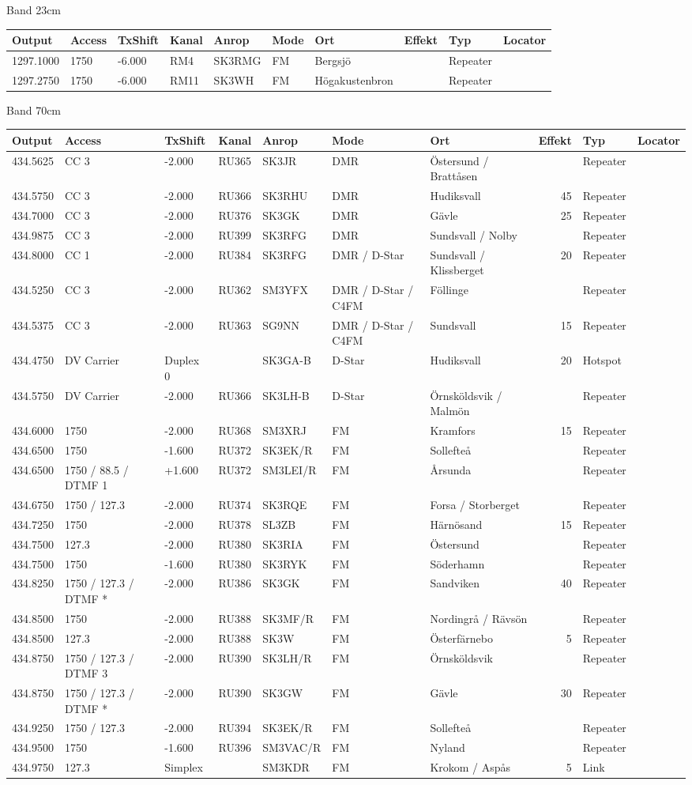 \large{Band 23cm}
\begin{longtable}{lllllllrlr}
Output & Access & TxShift & Kanal & Anrop & Mode & Ort & Effekt & Typ & Locator \\ \hline
1297.1000&1750&-6.000&RM4&SK3RMG&FM&Bergsjö&&Repeater&\\
1297.2750&1750&-6.000&RM11&SK3WH&FM&Högakustenbron&&Repeater&\\
\end{longtable}
\large{Band 70cm}
\begin{longtable}{lllllllrlr}
Output & Access & TxShift & Kanal & Anrop & Mode & Ort & Effekt & Typ & Locator \\ \hline
434.5625&CC 3&-2.000&RU365&SK3JR&DMR&Östersund / Brattåsen&&Repeater&\\
434.5750&CC 3&-2.000&RU366&SK3RHU&DMR&Hudiksvall&45&Repeater&\\
434.7000&CC 3&-2.000&RU376&SK3GK&DMR&Gävle&25&Repeater&\\
434.9875&CC 3&-2.000&RU399&SK3RFG&DMR&Sundsvall / Nolby&&Repeater&\\
434.8000&CC 1&-2.000&RU384&SK3RFG&DMR / D-Star&Sundsvall / Klissberget&20&Repeater&\\
434.5250&CC 3&-2.000&RU362&SM3YFX&DMR / D-Star / C4FM&Föllinge&&Repeater&\\
434.5375&CC 3&-2.000&RU363&SG9NN&DMR / D-Star / C4FM&Sundsvall&15&Repeater&\\
434.4750&DV Carrier&Duplex 0&&SK3GA-B&D-Star&Hudiksvall&20&Hotspot&\\
434.5750&DV Carrier&-2.000&RU366&SK3LH-B&D-Star&Örnsköldsvik / Malmön&&Repeater&\\
434.6000&1750&-2.000&RU368&SM3XRJ&FM&Kramfors&15&Repeater&\\
434.6500&1750&-1.600&RU372&SK3EK/R&FM&Sollefteå&&Repeater&\\
434.6500&1750 / 88.5 / DTMF 1&+1.600&RU372&SM3LEI/R&FM&Årsunda&&Repeater&\\
434.6750&1750 / 127.3&-2.000&RU374&SK3RQE&FM&Forsa / Storberget&&Repeater&\\
434.7250&1750&-2.000&RU378&SL3ZB&FM&Härnösand&15&Repeater&\\
434.7500&127.3&-2.000&RU380&SK3RIA&FM&Östersund&&Repeater&\\
434.7500&1750&-1.600&RU380&SK3RYK&FM&Söderhamn&&Repeater&\\
434.8250&1750 / 127.3 / DTMF *&-2.000&RU386&SK3GK&FM&Sandviken&40&Repeater&\\
434.8500&1750&-2.000&RU388&SK3MF/R&FM&Nordingrå / Rävsön&&Repeater&\\
434.8500&127.3&-2.000&RU388&SK3W&FM&Österfärnebo&5&Repeater&\\
434.8750&1750 / 127.3 / DTMF 3&-2.000&RU390&SK3LH/R&FM&Örnsköldsvik&&Repeater&\\
434.8750&1750 / 127.3 / DTMF *&-2.000&RU390&SK3GW&FM&Gävle&30&Repeater&\\
434.9250&1750 / 127.3&-2.000&RU394&SK3EK/R&FM&Sollefteå&&Repeater&\\
434.9500&1750&-1.600&RU396&SM3VAC/R&FM&Nyland&&Repeater&\\
434.9750&127.3&Simplex&&SM3KDR&FM&Krokom / Aspås&5&Link&\\
\end{longtable}
\clearpage
